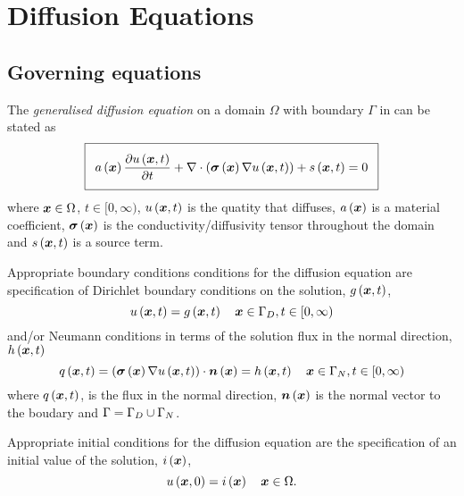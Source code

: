 \section{Diffusion Equations} 

\subsection{Governing equations}

The \emph{generalised diffusion equation} on a domain $\Omega$ with boundary
$\Gamma$ in \OpenCMISS can be stated as
\begin{equation}
  \addtolength{\fboxsep}{5pt}
  \boxed{
    \fnof{a}{\vectr{x}}\delby{\fnof{u}{\vectr{x},t}}{t}+
    \divergence{}{\pbrac{\fnof{\tensor{\sigma}}{\vectr{x}}\gradient{}{\fnof{u}{\vectr{x},t}}}}+
    \fnof{s}{\vectr{x},t}=0  
  }
  \label{eqn:diffusionequation}
\end{equation}
where $\boldsymbol{x}\in\Omega$, $t\in[0,\infty)$, $ u\left( \boldsymbol{x},t \right) $ is the quatity that diffuses,
$ a\left( \boldsymbol{x} \right) $ is a material coefficient, $ \boldsymbol{\mathit{\sigma}}\left( \boldsymbol{x} \right) $ is
the conductivity/diffusivity tensor throughout the domain and $ s\left( \boldsymbol{x},t \right) $ is a
source term.

Appropriate boundary conditions conditions for the diffusion
equation are specification of Dirichlet boundary conditions on the solution,
$ g\left( \boldsymbol{x},t \right) $, \ie
\begin{equation}
  \fnof{u}{\vectr{x},t} = \fnof{g}{\vectr{x},t} \quad \vectr{x}\in\Gamma_{D},t\in[0,\infty)
  \label{eqn:diffusionDirichletBC} 
\end{equation}
and/or Neumann conditions in terms of the solution flux in the normal
direction, $ h\left( \boldsymbol{x},t \right) $ \ie
\begin{equation}
  \fnof{q}{\vectr{x},t} = \dotprod{\pbrac{\fnof{\tensor{\sigma}}{\vectr{x}}
      \gradient{}{\fnof{u}{\vectr{x},t}}}}{\fnof{\normal}{\vectr{x}}} =
  \fnof{h}{\vectr{x},t} \quad \vectr{x}\in\Gamma_{N},t\in[0,\infty)
  \label{eqn:diffusionNeumannBC} 
\end{equation}
where $ q\left( \boldsymbol{x},t \right) $, is the flux in the normal direction, $ \boldsymbol{n}\left( \boldsymbol{x} \right) $ is the normal
vector to the boudary and $\Gamma=\Gamma_{D}\cup\Gamma_{N}$.

Appropriate initial conditions for the diffusion equation are the
specification of an initial value of the solution, $ i\left( \boldsymbol{x} \right) $, \ie
\begin{equation}
  \fnof{u}{\vectr{x},0} = \fnof{i}{\vectr{x}} \quad \vectr{x}\in\Omega.
  \label{eqn:diffusionInitialC} 
\end{equation}

